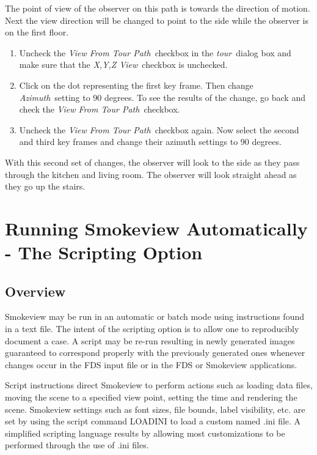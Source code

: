 \documentclass[11pt,twoside]{book}
\begin{document}
The point of view of the observer on this path is towards the
direction of motion. Next the view direction will be changed to
point to the side while the observer is on the first floor.

\begin{enumerate}
\item Uncheck the {\em View From Tour Path}\ checkbox in the {\em
tour}\ dialog box and make sure that the {\em X,Y,Z View}\
checkbox is unchecked.

\item Click on the dot representing the first key frame. Then
change {\em Azimuth}\ setting to 90 degrees.  To see the results
of the change, go back and check the {\em View From Tour Path}\
checkbox.

\item Uncheck the {\em View From Tour Path}\ checkbox again. Now
select the second and third key frames and change their azimuth
settings to 90 degrees.
\end{enumerate}

With this second set of changes, the observer will look to the
side as they pass through the kitchen and living room.  The
observer will look straight ahead as they go up the stairs.


\chapter{Running Smokeview Automatically - The Scripting Option}
\label{chapter:scripting}
\section{Overview}
Smokeview may be run in an automatic or batch mode using
instructions found in a text file.
The intent of the scripting option is to allow one to reproducibly document a case.
A script may be re-run resulting in newly generated images guaranteed to correspond properly with the previously generated
ones whenever changes occur in the FDS input file or in the FDS or Smokeview applications.

Script instructions direct Smokeview to perform actions such as loading data files, moving the scene to a specified view point, setting the time and rendering the scene.
Smokeview settings such as font sizes, file bounds, label visibility,
etc. are set by using the script command LOADINI to load a custom named .ini file.
A simplified scripting language results by allowing
most customizations to be performed through the use of .ini files.
\end{document}
